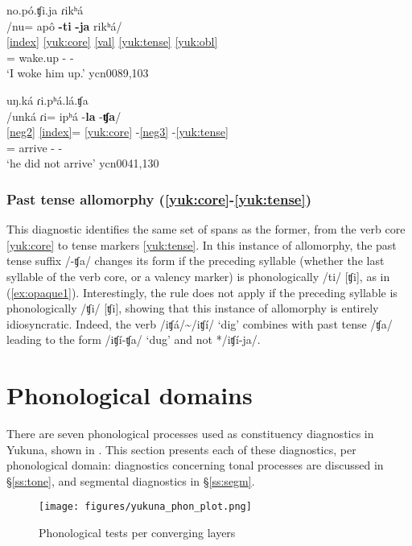 \documentclass[output=paper]{langscibook}
\begin{document}
\ea \label{ex:opaqueb}
no.pó.ʧi.ja ɾikʰá   \\
    \glll  /nu= apô \textbf{-ti} \textbf{-ja} rikʰá/ \\
    \ref{index} \ref{yuk:core} \ref{val} \ref{yuk:tense} \ref{yuk:obl} \\
    \Fsg{}= wake.up -\Caus{} -\Pst{} \Tsg{} \\
\glt `I woke him up.' \hfill ycn0089,103
    \z

\ea \label{ex:opaque2}
uŋ.ká ɾi.pʰá.lá.ʧa   \\
    \glll /unká ɾi= ipʰá -\textbf{la} -\textbf{ʧa}/  \\
        \ref{neg2} \ref{index}= \ref{yuk:core} -\ref{neg3} -\ref{yuk:tense}\\
     \Neg{} \Tsg{}= arrive -\Neg{} -\Pst{}\\
    \glt `he did not arrive' \hfill ycn0041,130
\z


\subsubsection{Past tense allomorphy (\ref{yuk:core}-\ref{yuk:tense})} 
 This diagnostic identifies the same set of spans as the former, from the verb core \ref{yuk:core} to tense markers \ref{yuk:tense}. In this instance of allomorphy, the past tense suffix /-ʧa/ changes its form if the preceding syllable (whether the last syllable of the verb core, or a valency marker) is phonologically /ti/ [ʧi], as in (\ref{ex:opaque1}).  Interestingly, the rule does not apply if the preceding syllable is phonologically /ʧi/ [ʧi], showing that this instance of allomorphy is entirely idiosyncratic. Indeed, the verb  /iʧá/\textasciitilde{}/iʧí/ `dig' combines with past tense /ʧa/ leading to the form /iʧí-ʧa/ `dug' and not */iʧí-ja/.

\section{Phonological domains} %
\label{sec:phdomains}

There are seven phonological processes used as constituency diagnostics in Yukuna, shown in . This section presents each of these diagnostics, per phonological domain: diagnostics concerning tonal processes are discussed in §\ref{ss:tone}, and segmental diagnostics in §\ref{ss:segm}.

\begin{figure}
\centering
\texttt{[image: figures/yukuna\_phon\_plot.png]}
\caption{Phonological tests per converging layers}
\label{fig:4}
\end{figure}
\end{document}
